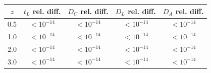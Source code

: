 \begin{tabular}{ccccc}
\toprule
$z$ & $t_L$ rel. diff. & $D_C$ rel. diff. & $D_L$ rel. diff. & $D_A$ rel. diff. \\
\midrule
0.5 & $<10^{-14}$ & $<10^{-14}$ & $<10^{-14}$ & $<10^{-14}$ \\
1.0 & $<10^{-14}$ & $<10^{-14}$ & $<10^{-14}$ & $<10^{-14}$ \\
2.0 & $<10^{-14}$ & $<10^{-14}$ & $<10^{-14}$ & $<10^{-14}$ \\
3.0 & $<10^{-14}$ & $<10^{-14}$ & $<10^{-14}$ & $<10^{-14}$ \\
\bottomrule
\end{tabular}